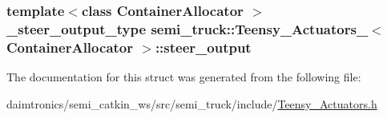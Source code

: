 \subsubsection[{\texorpdfstring{steer\+\_\+output}{steer_output}}]{\setlength{\rightskip}{0pt plus 5cm}template$<$class Container\+Allocator $>$ {\bf \+\_\+steer\+\_\+output\+\_\+type} {\bf semi\+\_\+truck\+::\+Teensy\+\_\+\+Actuators\+\_\+}$<$ Container\+Allocator $>$\+::steer\+\_\+output}\hypertarget{structsemi__truck_1_1_teensy___actuators___aa98f0b646061a5b36b71922a6fe0630f}{}\label{structsemi__truck_1_1_teensy___actuators___aa98f0b646061a5b36b71922a6fe0630f}


The documentation for this struct was generated from the following file\+:\begin{DoxyCompactItemize}
\item 
daimtronics/semi\+\_\+catkin\+\_\+ws/src/semi\+\_\+truck/include/\hyperlink{_teensy___actuators_8h}{Teensy\+\_\+\+Actuators.\+h}\end{DoxyCompactItemize}
